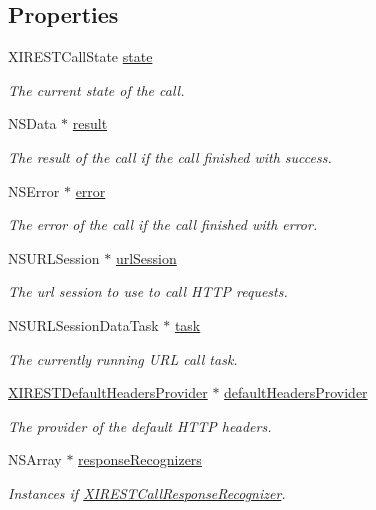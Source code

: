 \subsection*{Properties}
\begin{DoxyCompactItemize}
\item 
X\+I\+R\+E\+S\+T\+Call\+State \hyperlink{category_x_i_simple_r_e_s_t_call_07_08_a6364ccaf1317a77df115ede73206cf24}{state}
\begin{DoxyCompactList}\small\item\em The current state of the call. \end{DoxyCompactList}\item 
N\+S\+Data $\ast$ \hyperlink{category_x_i_simple_r_e_s_t_call_07_08_af4144cce1ed9a24c994cb158e0fdec58}{result}
\begin{DoxyCompactList}\small\item\em The result of the call if the call finished with success. \end{DoxyCompactList}\item 
N\+S\+Error $\ast$ \hyperlink{category_x_i_simple_r_e_s_t_call_07_08_a6f1a442876e355a9b79fdfdba78cadf8}{error}
\begin{DoxyCompactList}\small\item\em The error of the call if the call finished with error. \end{DoxyCompactList}\item 
N\+S\+U\+R\+L\+Session $\ast$ \hyperlink{category_x_i_simple_r_e_s_t_call_07_08_abbcaa23c8ae325fb2a3b17b1b00402f9}{url\+Session}
\begin{DoxyCompactList}\small\item\em The url session to use to call H\+T\+TP requests. \end{DoxyCompactList}\item 
N\+S\+U\+R\+L\+Session\+Data\+Task $\ast$ \hyperlink{category_x_i_simple_r_e_s_t_call_07_08_a62e37bff2f70f011fea6c61b854c6b17}{task}
\begin{DoxyCompactList}\small\item\em The currently running U\+RL call task. \end{DoxyCompactList}\item 
\hyperlink{interface_x_i_r_e_s_t_default_headers_provider}{X\+I\+R\+E\+S\+T\+Default\+Headers\+Provider} $\ast$ \hyperlink{category_x_i_simple_r_e_s_t_call_07_08_a91235d31715c2e3cd41bff9419d44b62}{default\+Headers\+Provider}
\begin{DoxyCompactList}\small\item\em The provider of the default H\+T\+TP headers. \end{DoxyCompactList}\item 
N\+S\+Array $\ast$ \hyperlink{category_x_i_simple_r_e_s_t_call_07_08_a3e5908b5178dc6f0813437222e67dd22}{response\+Recognizers}
\begin{DoxyCompactList}\small\item\em Instances if \hyperlink{}{X\+I\+R\+E\+S\+T\+Call\+Response\+Recognizer}. \end{DoxyCompactList}\end{DoxyCompactItemize}


